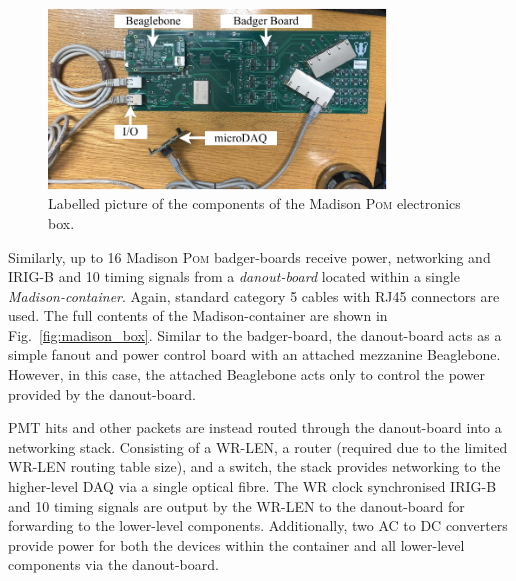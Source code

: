 \begin{figure} %
    \includegraphics[width=0.8\textwidth]{diagrams/5-daq/madison_plane.pdf}
    \caption[Labelled picture of the components of the Madison \textsc{Pom} electronics box.]
    {Labelled picture of the components of the Madison \textsc{Pom} electronics box.}
    \label{fig:madison_plane}
\end{figure}

Similarly, up to 16 Madison \textsc{Pom} badger-boards receive power, networking and IRIG-B and
\unit{10}{} timing signals from a \emph{danout-board} located within a single
\emph{Madison-container}. Again, standard category 5 cables with RJ45 connectors are used. The
full contents of the Madison-container are shown in Fig.~\ref{fig:madison_box}. Similar to the
badger-board, the danout-board acts as a simple fanout and power control board with an attached
mezzanine Beaglebone. However, in this case, the attached Beaglebone acts only to control the
power provided by the danout-board.

PMT hits and other packets are instead routed through the danout-board into a networking stack.
Consisting of a WR-LEN, a router (required due to the limited WR-LEN routing table size), and a
switch, the stack provides networking to the higher-level DAQ via a single optical fibre. The WR
clock synchronised IRIG-B and \unit{10}{} timing signals are output by the WR-LEN to
the danout-board for forwarding to the lower-level components. Additionally, two AC to DC
converters provide power for both the devices within the container and all lower-level components
via the danout-board.

